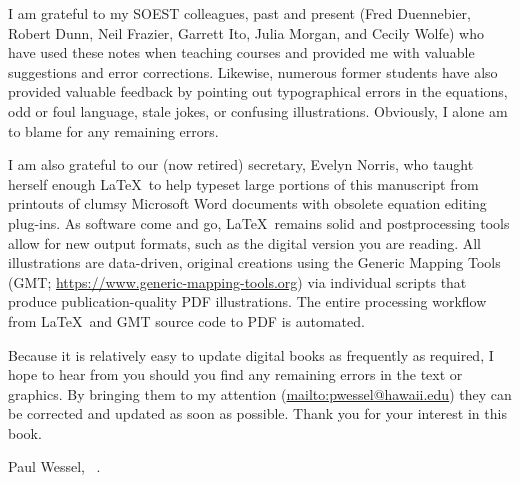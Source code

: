 I am grateful to my SOEST colleagues, past and present (Fred Duennebier, Robert Dunn, Neil Frazier,
Garrett Ito, Julia Morgan, and Cecily Wolfe) who have used these notes when teaching
courses and provided me with valuable suggestions and error corrections.  Likewise, numerous former students have
also provided valuable feedback by pointing out typographical errors in the equations, odd or foul language,
stale jokes, or confusing illustrations.  Obviously, I alone am to blame for any remaining errors.

I am also grateful to our (now retired) secretary, Evelyn Norris,
who taught herself enough \LaTeX\ to help typeset large portions of this manuscript from printouts of clumsy Microsoft Word documents
with obsolete equation editing plug-ins.  As software come and go, \LaTeX\ remains solid and postprocessing tools allow
for new output formats, such as the digital version you are reading.  All illustrations are data-driven, original creations using the
Generic Mapping Tools (GMT; \url{https://www.generic-mapping-tools.org}) via individual scripts that produce
publication-quality PDF illustrations.  The entire processing workflow from \LaTeX\ and GMT source code to PDF is automated.

Because it is relatively easy to update digital books as frequently as required, I hope to hear from you should you find any remaining errors
in the text or graphics.  By bringing them to my attention (\url{mailto:pwessel@hawaii.edu})
they can be corrected and updated as soon as possible.  Thank you for your interest in this book.

\vspace{2\baselineskip}
Paul Wessel, \DAmonth\ \DAyear.
